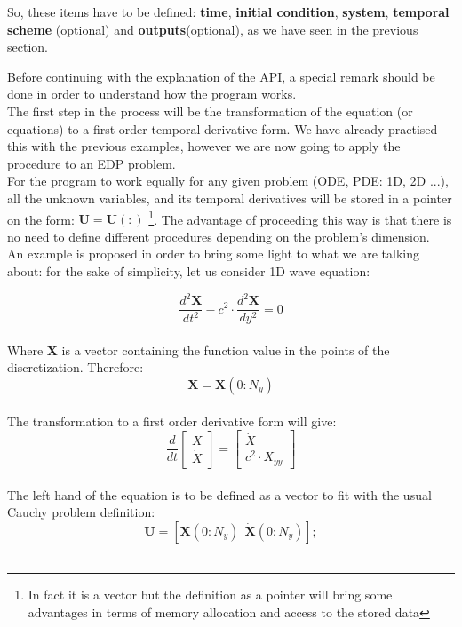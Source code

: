 So, these items have to be defined: \textbf{time}, \textbf{initial
condition}, \textbf{system}, \textbf{temporal scheme} (optional)
and \textbf{outputs}(optional), as we have seen in the
previous section. 
\\

\vspace{1cm}


Before continuing with the explanation of the API, a special remark should be
done in order to understand how the program works. \\

The first step in the process will be the transformation of the equation (or
equations) to a first-order temporal derivative form. We have already practised
this with the previous examples, however we are now going to apply the procedure
to an EDP problem. \\

For the program to work equally for any given problem (ODE, PDE: 1D, 2D ...),
all the unknown variables, and its temporal derivatives will be stored in a pointer on
the form:
$\mathbf{U}=\mathbf{U}(:)$ \footnote{In fact it is a vector but the definition
as a pointer will bring some advantages in terms of memory allocation and
access to the stored data}.
The advantage of proceeding this way is that there is no need to define different procedures depending on the problem's
dimension.\\

An example is proposed in order to bring some light to what we are talking
about: for the sake of simplicity, let us consider 1D wave
equation:

$$
\frac{d^2 \mathbf{X}}{dt^2}-c^2\cdot\frac{d^2 \mathbf{X}}{dy^2}=0
$$\\

Where $\mathbf{X}$ is a vector containing the function value in the points of
the discretization. Therefore: $$\mathbf{X}=\mathbf{X}(0:N_y)$$ \\

The transformation to a first order derivative form will give: 
$$
\frac{d}{dt}
\begin{bmatrix}
X\\
\dot X
\end{bmatrix}= \begin{bmatrix}
\dot X\\
c^2 \cdot X_{yy}
\end{bmatrix}
$$\\

The left hand of the equation is to be defined as a vector to fit with the usual
Cauchy problem definition: 
$$
\mathbf{U}=[\mathbf{X}(0:N_y) \:\: \mathbf{\dot X}(0:N_y)]; 
$$\\

